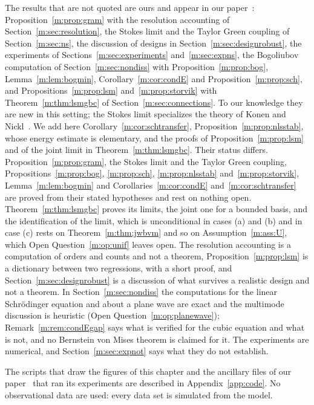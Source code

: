 The results that are not quoted are ours and appear in our paper~\cite{polsonsokolov2026manifold}: Proposition~\ref{m:prop:gram} with the resolution accounting of Section~\ref{m:sec:resolution}, the Stokes limit and the Taylor Green coupling of Section~\ref{m:sec:ns}, the discussion of designs in Section~\ref{m:sec:designrobust}, the experiments of Sections~\ref{m:sec:experiments} and~\ref{m:sec:expns}, the Bogoliubov computation of Section~\ref{m:sec:nondiss} with Proposition~\ref{m:prop:bog}, Lemma~\ref{m:lem:bogmin}, Corollary~\ref{m:cor:condE} and Proposition~\ref{m:prop:sch}, and Propositions~\ref{m:prop:lsm} and~\ref{m:prop:storvik} with Theorem~\ref{m:thm:lsmgbc} of Section~\ref{m:sec:connections}. To our knowledge they are new in this setting; the Stokes limit specializes the theory of Konen and Nickl~\cite{konennickl2026}. We add here Corollary~\ref{m:cor:schtransfer}, Proposition~\ref{m:prop:nlsstab}, whose energy estimate is elementary, and the proofs of Proposition~\ref{m:prop:lsm} and of the joint limit in Theorem~\ref{m:thm:lsmgbc}. Their status differs. Proposition~\ref{m:prop:gram}, the Stokes limit and the Taylor Green coupling, Propositions~\ref{m:prop:bog}, \ref{m:prop:sch}, \ref{m:prop:nlsstab} and~\ref{m:prop:storvik}, Lemma~\ref{m:lem:bogmin} and Corollaries~\ref{m:cor:condE} and~\ref{m:cor:schtransfer} are proved from their stated hypotheses and rest on nothing open. Theorem~\ref{m:thm:lsmgbc} proves its limits, the joint one for a bounded basis, and the identification of the limit, which is unconditional in cases (a) and (b) and in case (c) rests on Theorem~\ref{m:thm:jwbvm} and so on Assumption~\ref{m:ass:U}, which Open Question~\ref{m:op:unif} leaves open. The resolution accounting is a computation of orders and counts and not a theorem, Proposition~\ref{m:prop:lsm} is a dictionary between two regressions, with a short proof, and Section~\ref{m:sec:designrobust} is a discussion of what survives a realistic design and not a theorem. In Section~\ref{m:sec:nondiss} the computations for the linear Schr\"odinger equation and about a plane wave are exact and the multimode discussion is heuristic (Open Question~\ref{m:op:planewave}); Remark~\ref{m:rem:condEgap} says what is verified for the cubic equation and what is not, and no Bernstein von Mises theorem is claimed for it. The experiments are numerical, and Section~\ref{m:sec:expnot} says what they do not establish.

The scripts that draw the figures of this chapter and the ancillary files of our paper~\cite{polsonsokolov2026manifold} that ran its experiments are described in Appendix~\ref{app:code}. No observational data are used: every data set is simulated from the model.
